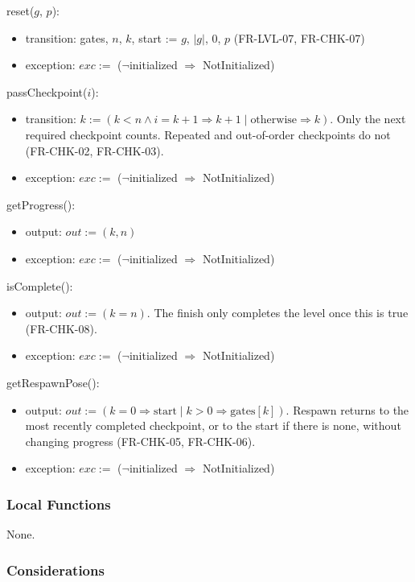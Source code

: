 \documentclass[12pt, titlepage]{article}
\newcommand{\True}{\textnormal{true}}
\newcommand{\noinit}{$\neg$initialized $\Rightarrow$ NotInitialized}
\begin{document}
\noindent reset($g$, $p$):
\begin{itemize}
\item transition: gates, $n$, $k$, start := $g$, $|g|$, 0, $p$ (FR-LVL-07,
  FR-CHK-07)
\item exception: $exc :=$ (\noinit)
\end{itemize}

\noindent passCheckpoint($i$):
\begin{itemize}
\item transition: $k := (k < n \wedge i = k + 1 \Rightarrow k + 1 \;|\;
  \text{otherwise} \Rightarrow k)$. Only the next required checkpoint counts.
  Repeated and out-of-order checkpoints do not (FR-CHK-02, FR-CHK-03).
\item exception: $exc :=$ (\noinit)
\end{itemize}

\noindent getProgress():
\begin{itemize}
\item output: $out := (k, n)$
\item exception: $exc :=$ (\noinit)
\end{itemize}

\noindent isComplete():
\begin{itemize}
\item output: $out := (k = n)$. The finish only completes the level once this
  is \True{} (FR-CHK-08).
\item exception: $exc :=$ (\noinit)
\end{itemize}

\noindent getRespawnPose():
\begin{itemize}
\item output: $out := (k = 0 \Rightarrow \text{start} \;|\; k > 0
  \Rightarrow \text{gates}[k])$. Respawn returns to the most recently
  completed checkpoint, or to the start if there is none, without changing
  progress (FR-CHK-05, FR-CHK-06).
\item exception: $exc :=$ (\noinit)
\end{itemize}

\subsubsection{Local Functions}

None.

\subsubsection{Considerations}
\end{document}
